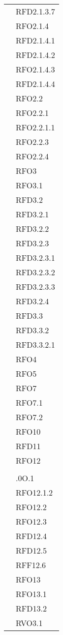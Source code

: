 \begin{longtable}{|>{\centering}m{10cm}|m{3cm}<{\centering}|}
& RFD2.1.3.7\\
& RFO2.1.4\\
& RFD2.1.4.1\\
& RFD2.1.4.2\\
& RFO2.1.4.3\\
& RFD2.1.4.4\\
& RFO2.2\\
& RFO2.2.1\\
& RFO2.2.1.1\\
& RFO2.2.3\\
& RFO2.2.4\\
& RFO3\\
& RFO3.1\\
& RFD3.2\\
& RFD3.2.1\\
& RFD3.2.2\\
& RFD3.2.3\\
& RFD3.2.3.1\\
& RFD3.2.3.2\\
& RFD3.2.3.3\\
& RFD3.2.4\\
& RFD3.3\\
& RFD3.3.2\\
& RFD3.3.2.1\\
& RFO4\\
& RFO5\\
& RFO7\\
& RFO7.1\\
& RFO7.2\\
& RFO10\\
& RFD11\\
& RFO12\\
& \\
& .0O.1\\
& RFO12.1.2\\
& RFO12.2\\
& RFO12.3\\
& RFD12.4\\
& RFD12.5\\
& RFF12.6\\
& RFO13\\
& RFO13.1\\
& RFD13.2\\
& RVO3.1\\ \hline


\end{longtable}
